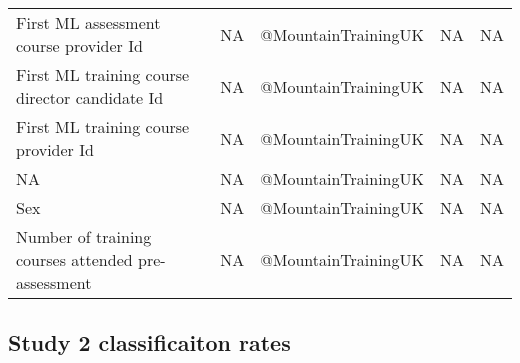 \documentclass[a4paper,]{book}
\begin{document}
\begin{table}
\begin{tabular}[t]{lllrr}
\addlinespace
First ML assessment course provider Id & NA & @﻿MountainTrainingUK & NA & NA\\
First ML training course director candidate Id & NA & @﻿MountainTrainingUK & NA & NA\\
First ML training course provider Id & NA & @﻿MountainTrainingUK & NA & NA\\
NA & NA & @﻿MountainTrainingUK & NA & NA\\
Sex & NA & @﻿MountainTrainingUK & NA & NA\\
\addlinespace
Number of training courses attended pre-assessment & NA & @﻿MountainTrainingUK & NA & NA\\
\bottomrule
\end{tabular}
\end{table}

\hypertarget{study-2-classificaiton-rates}{%
\subsection{Study 2 classificaiton rates}\label{study-2-classificaiton-rates}}
\end{document}
